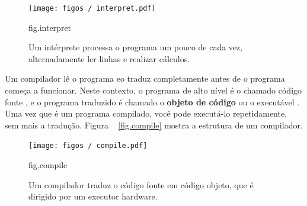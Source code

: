 \documentclass[10pt]{book}
\begin{document}
\begin{figure}
\centerline
{\texttt{[image: figos / interpret.pdf]}}
\caption{Um intérprete processa o programa um pouco de cada vez,
alternadamente ler linhas e realizar cálculos.}
\label{} fig.interpret
\end{figure}

Um compilador lê o programa eo traduz completamente antes de o
programa começa a funcionar. Neste contexto, o programa de alto nível é
o chamado código fonte {\bf}, e o programa traduzido é chamado o
{\bf objeto de código} ou {o executável \bf}. Uma vez que é um programa
compilado, você pode executá-lo repetidamente, sem mais a tradução.
Figura ~ \ref {fig.compile} mostra a estrutura de um compilador.

\begin{figure}
\centerline
{\texttt{[image: figos / compile.pdf]}}
\caption{Um compilador traduz o código fonte em código objeto, que é
dirigido por um executor hardware.}
\label{} fig.compile
\end{figure}
\end{document}
